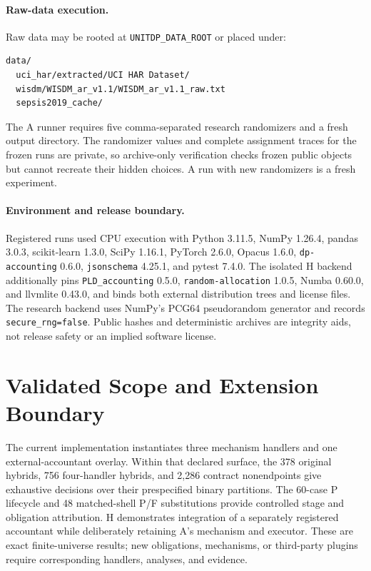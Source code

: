 \documentclass[letterpaper]{article}
\begin{document}
\paragraph{Raw-data execution.}
Raw data may be rooted at \texttt{UNITDP\_DATA\_ROOT} or placed under:
{\footnotesize
\begin{verbatim}
data/
  uci_har/extracted/UCI HAR Dataset/
  wisdm/WISDM_ar_v1.1/WISDM_ar_v1.1_raw.txt
  sepsis2019_cache/
\end{verbatim}
}
The A runner requires five comma-separated research randomizers and a fresh
output directory.  The randomizer values and complete assignment traces for
the frozen runs are private, so archive-only verification checks frozen public
objects but cannot recreate their hidden choices.  A run with new randomizers
is a fresh experiment.

\paragraph{Environment and release boundary.}
Registered runs used CPU execution with Python 3.11.5, NumPy 1.26.4,
pandas 3.0.3, scikit-learn 1.3.0, SciPy 1.16.1, PyTorch 2.6.0, Opacus 1.6.0,
\texttt{dp-accounting} 0.6.0, \texttt{jsonschema} 4.25.1, and pytest 7.4.0.
The isolated H backend additionally pins \texttt{PLD\_accounting} 0.5.0,
\texttt{random-allocation} 1.0.5, Numba 0.60.0, and llvmlite 0.43.0, and
binds both external distribution trees and license files.
The research backend uses NumPy's PCG64 pseudorandom generator and records
\texttt{secure\_rng=false}.  Public hashes and deterministic archives are
integrity aids, not release safety or an implied software license.

\section{Validated Scope and Extension Boundary}

The current implementation instantiates three mechanism handlers and one
external-accountant overlay.  Within that declared surface, the 378 original
hybrids, 756 four-handler hybrids, and 2,286 contract nonendpoints give
exhaustive decisions over their prespecified binary partitions.  The 60-case P
lifecycle and 48 matched-shell P/F substitutions provide controlled stage and
obligation attribution.  H demonstrates integration of a separately
registered accountant while deliberately retaining A's mechanism and executor.
These are exact finite-universe results; new obligations, mechanisms, or
third-party plugins require corresponding handlers, analyses, and evidence.
\end{document}
